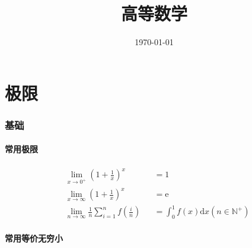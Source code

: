 \documentclass{article}
\title{高等数学}
\author{}
\date{\today}
\begin{document}
\hypersetup{
    hidelinks,
    allcolors = black,
    breaklinks = true
}

\newtheorem{definition}{Definition}[subsection]
\newtheorem{theorem}{Theorem}[subsection]
\newtheorem{corollary}{Corollary}[theorem]
\renewcommand{\proofname}{\indent\bf Proof}
\renewcommand{\Re}{\operatorname{Re}}
\renewcommand{\Im}{\operatorname{Im}}

\def\e{\mathrm e}
\def\i{\mathrm i}
\def\d{\mathrm d}
\def\C{\mathrm C}
\def\vecv{\vec{\mathrm v}}
\def\sr{\mathbb R}
\def\sn{\mathbb N}
\def\snp{\mathbb N^+}
\def\sc{\mathbb C}
\def\sz{\mathbb Z}
\def\sech{\mathrm{sech}}
\def\csch{\mathrm{csch}}

\newcommand{\abs}[1]{\left|#1\right|}
\newcommand{\p}[1]{\left(#1\right)}
\newcommand{\jacobi}[2]{\frac{\partial\p{#1}}{\partial\p{#2}}}

\begin{titlepage}
    \maketitle
\end{titlepage}

\tableofcontents
\newpage

\part{极限}

\section{基础}

\subsection{常用极限}

\[\begin{aligned}
         & \lim_{x\to0^+}{\p{1+\frac1x}^x}                     &  & =1                              \\
         & \lim_{x\to\infty}{\p{1+\frac1x}^x}                  &  & =\e                             \\
         & \lim_{n\to\infty}{\frac1n\sum_{i=1}^nf\p{\frac in}} &  & =\int_0^1f\p{x}\d x\p{n\in\snp}
    \end{aligned}\]

\subsection{常用等价无穷小}
\end{document}
